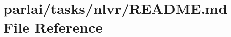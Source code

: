 \hypertarget{parlai_2tasks_2nlvr_2README_8md}{}\section{parlai/tasks/nlvr/\+R\+E\+A\+D\+ME.md File Reference}
\label{parlai_2tasks_2nlvr_2README_8md}
